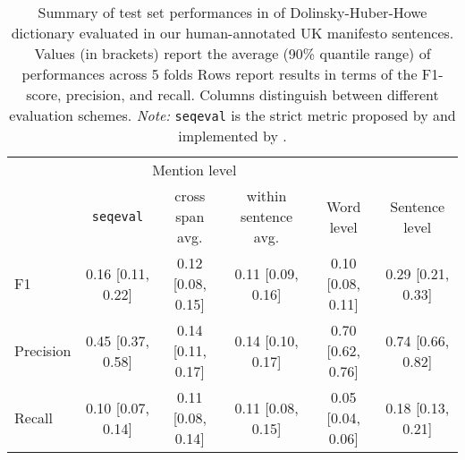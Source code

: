 \begin{table}[!t]

\caption{\label{tab:eval_uk-manifestos_all_metrics}Summary of test set performances in of Dolinsky-Huber-Howe dictionary evaluated in our human-annotated UK manifesto sentences. Values (in brackets) report the average (90\% quantile range) of performances across 5 folds Rows report results in terms of the F1-score, precision, and recall. Columns distinguish between different evaluation schemes. \emph{Note:} \texttt{seqeval} is the strict metric proposed by \citet{ramshaw_text_1995} and implemented by \citet{nakayama_seqeval_2018}.}
\centering
\fontsize{10}{12}\selectfont
\begin{tabular}[t]{lccccc}
\toprule
\multicolumn{1}{c}{ } & \multicolumn{3}{c}{Mention level} & \multicolumn{2}{c}{ } \\
\cmidrule(l{3pt}r{3pt}){2-4}
 & \texttt{seqeval} & cross span avg. & within sentence avg. & Word level & Sentence level\\
\midrule
F1 & 0.16 [0.11, 0.22] & 0.12 [0.08, 0.15] & 0.11 [0.09, 0.16] & 0.10 [0.08, 0.11] & 0.29 [0.21, 0.33]\\
Precision & 0.45 [0.37, 0.58] & 0.14 [0.11, 0.17] & 0.14 [0.10, 0.17] & 0.70 [0.62, 0.76] & 0.74 [0.66, 0.82]\\
Recall & 0.10 [0.07, 0.14] & 0.11 [0.08, 0.14] & 0.11 [0.08, 0.15] & 0.05 [0.04, 0.06] & 0.18 [0.13, 0.21]\\
\bottomrule
\end{tabular}
\end{table}

